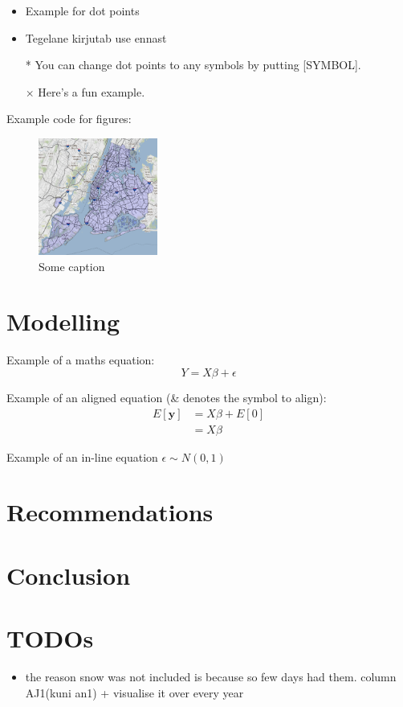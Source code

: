 \documentclass[11pt]{article}
\begin{document}
\begin{itemize} 
    \item Example for dot points
    \item Tegelane kirjutab use ennast
    \item[*] You can change dot points to any symbols by putting [SYMBOL].
    \item[$\times$] Here's a fun example.
\end{itemize} 
\lipsum[4-5]
Example code for figures:
\begin{figure}[h]
    \includegraphics[width=0.35\textwidth]{nyc_map.PNG}
    \centering
    \caption{Some caption} %
\end{figure}
\lipsum[1-2]

\section{Modelling}
Example of a maths equation:
\begin{equation}
    Y = X\beta + \epsilon
\end{equation}

Example of an aligned equation (\& denotes the symbol to align):
\begin{align*}
    E[\mathbf{y}] &= X\beta + E[0] \\
                  &= X\beta
\end{align*}

Example of an in-line equation $\epsilon \sim N(0, 1)$

\section{Recommendations}
\lipsum[10]

\section{Conclusion}
\lipsum[14-15]

\section{TODOs}
\begin{itemize} 
    \item the reason snow was not included is because so few days had them. column AJ1(kuni an1) + visualise it over every year
\end{itemize} 


\clearpage

\printbibliography
\end{document}
